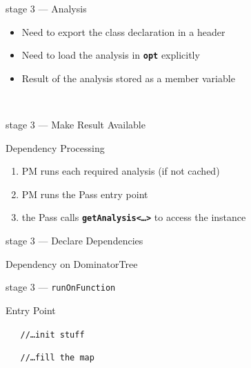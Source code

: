 \documentclass[14pt]{beamer}
\newcommand{\Command}[1]{\textbf{\texttt{#1}}}
\newcommand{\Code}[1]{\textbf{\texttt{#1}}}
\begin{document}
    \begin{frame}[containsverbatim]{stage 3 --- Analysis}

        \begin{itemize}
            \item Need to export the class declaration in a header
            \item Need to load the analysis in \Command{opt} explicitly
            \item Result of the analysis stored as a member variable
        \end{itemize}

        \\
        {
        \footnotesize
        
        }
    \end{frame}

    \begin{frame}[containsverbatim]{stage 3 --- Make Result Available}
        \begin{alertblock}{Dependency Processing}
            \begin{enumerate}
                \item PM runs each required analysis (if not cached)
                \item PM runs the Pass entry point
                \item the Pass calls \Code{getAnalysis<\dots>} to access the instance
            \end{enumerate}
        \end{alertblock}
    \end{frame}


    \begin{frame}[containsverbatim]{stage 3 --- Declare Dependencies}

        \begin{alertblock}{Dependency on DominatorTree}
        {
        \footnotesize
        
        }
        \end{alertblock}

    \end{frame}

    \begin{frame}[containsverbatim]{stage 3 --- \texttt{runOnFunction}}
        \begin{alertblock}{Entry Point}
        {
        \footnotesize
        
        \texttt{~~~//\dots init stuff}
        
        \texttt{~~~//\dots fill the map}
        
        }
        \end{alertblock}
    \end{frame}
\end{document}
